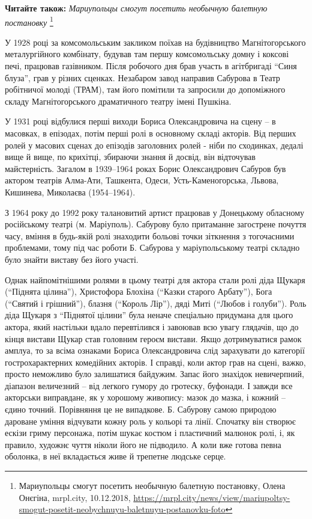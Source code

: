 
\textbf{Читайте також:} \emph{Мариупольцы смогут посетить необычную балетную постановку}%
\footnote{Мариупольцы смогут посетить необычную балетную постановку, Олена Онєгіна, mrpl.city, 10.12.2018, \url{https://mrpl.city/news/view/mariupoltsy-smogut-posetit-neobychnuyu-baletnuyu-postanovku-foto} }

У 1928 році за комсомольським закликом поїхав на будівництво Магнітогорського
металургійного комбінату, будував там першу комсомольську домну і коксові печі,
працював газівником. Після робочого дня брав участь в агітбригаді \enquote{Синя блуза},
грав у різних сценках. Незабаром завод направив Сабурова в Театр робітничої
молоді (ТРАМ), там його помітили та запросили до допоміжного складу
Магнітогорського драматичного театру імені Пушкіна.


У 1931 році відбулися перші виходи Бориса Олександровича на сцену – в масовках,
в епізодах, потім перші ролі в основному складі акторів. Від перших ролей у
масових сценах до епізодів заголовних ролей - ніби по сходинках, дедалі вище й
вище, по крихітці, збираючи знання й досвід, він відточував майстерність.
Загалом в 1939–1964 роках Борис Олександрович Сабуров був актором театрів
Алма-Ати, Ташкента, Одеси, Усть-Каменогорська, Львова, Кишинева, Миколаєва
(1954–1964).

З 1964 року до 1992 року талановитий артист працював у Донецькому обласному
російському театрі (м. Маріуполь). Сабурову було притаманне загострене почуття
часу, вміння в будь-якій ролі знаходити больові точки зіткнення з тогочасними
проблемами, тому під час роботи Б. Сабурова у маріупольському театрі складно
було знайти виставу без його участі.


Однак найпомітнішими ролями в цьому театрі для актора стали ролі діда Щукаря
(\enquote{Піднята цілина}), Христофора Блохіна (\enquote{Казки старого
Арбату}), Бога (\enquote{Святий і грішний}), блазня (\enquote{Король Лір}),
дяді Миті (\enquote{Любов і голуби}). Роль діда Щукаря з \enquote{Піднятої
цілини} була неначе спеціально придумана для цього актора, який настільки вдало
перевтілився і завоював всю увагу глядачів, що до кінця вистави Щукар став
головним героєм вистави. Якщо дотримуватися рамок амплуа, то за всіма ознаками
Бориса Олександровича слід зарахувати до категорії гострохарактерних комедійних
акторів. І справді, коли актор грав на сцені, важко, просто неможливо було
залишатися байдужим. Запас його знахідок невичерпний, діапазон величезний – від
легкого гумору до гротеску, буфонади. І завжди все акторськи виправдане, як у
хорошому живопису: мазок до мазка, і кожний – єдино точний. Порівняння це не
випадкове. Б. Сабурову самою природою дароване уміння відчувати кожну роль у
кольорі та лінії. Спочатку він створює ескізи гриму персонажа, потім шукає
костюм і пластичний малюнок ролі, і, як правило, художнє чуття ніколи його не
підводило. А коли вже готова певна оболонка, в неї вкладається живе й трепетне
людське серце.

